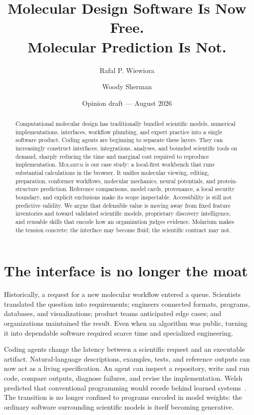 \documentclass[10pt]{article}
\title{\vspace{-2.5em}\textbf{Molecular Design Software Is Now Free.\\Molecular Prediction Is Not.}}
\author{Rafal P. Wiewiora \and Woody Sherman}
\date{Opinion draft --- August 2026}
\newcommand{\molarium}{\textsc{Molarium}}
\begin{document}
\maketitle
\vspace{-1.4em}

\begin{abstract}
Computational molecular design has traditionally bundled scientific models, numerical implementations, interfaces, workflow plumbing, and expert practice into a single software product.
Coding agents are beginning to separate these layers.
They can increasingly construct interfaces, integrations, analyses, and bounded scientific tools on demand, sharply reducing the time and marginal cost required to reproduce implementation.
\molarium{} is our case study: a local-first workbench that runs substantial calculations in the browser.
It unifies molecular viewing, editing, preparation, conformer workflows, molecular mechanics, neural potentials, and protein-structure prediction.
Reference comparisons, model cards, provenance, a local security boundary, and explicit exclusions make its scope inspectable.
Accessibility is still not predictive validity.
We argue that defensible value is moving away from fixed feature inventories and toward validated scientific models, proprietary discovery intelligence, and reusable skills that encode how an organization judges evidence.
Molarium makes the tension concrete: the interface may become fluid; the scientific contract may not.
\end{abstract}

\section*{The interface is no longer the moat}

Historically, a request for a new molecular workflow entered a queue.
Scientists translated the question into requirements; engineers connected formats, programs, databases, and visualizations; product teams anticipated edge cases; and organizations maintained the result.
Even when an algorithm was public, turning it into dependable software required scarce time and specialized engineering.

Coding agents change the latency between a scientific request and an executable artifact.
Natural-language descriptions, examples, tests, and reference outputs can now act as a living specification.
An agent can inspect a repository, write and run code, compare outputs, diagnose failures, and revise the implementation.
Welsh predicted that conventional programming would recede behind learned systems~\cite{welsh2023end}.
The transition is no longer confined to programs encoded in model weights: the ordinary software surrounding scientific models is itself becoming generative.
\end{document}
